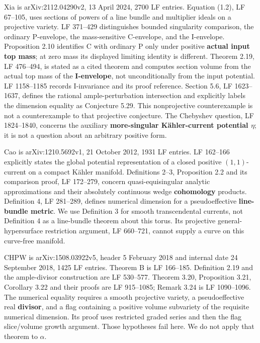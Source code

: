\documentclass[11pt]{article}
\begin{document}
Xia is arXiv:2112.04290v2, 13 April 2024, 2700 LF entries. Equation (1.2), LF 67–105, uses sections of powers of a line bundle and multiplier ideals on a projective variety. LF 371–429 distinguishes bounded singularity comparison, the ordinary P-\allowbreak{}envelope, the mass-\allowbreak{}sensitive C-\allowbreak{}envelope, and the I-\allowbreak{}envelope. Proposition 2.10 identifies C with ordinary P only under positive \textbf{actual input top mass}; at zero mass its displayed limiting identity is different. Theorem 2.19, LF 476–494, is stated as a cited theorem and computes section volume from the actual top mass of the \textbf{I-\allowbreak{}envelope}, not unconditionally from the input potential. LF 1158–1185 records I-\allowbreak{}invariance and its proof reference. Section 5.6, LF 1623–1637, defines the rational ample-\allowbreak{}perturbation intersection and explicitly labels the dimension equality as Conjecture 5.29. This nonprojective counterexample is not a counterexample to that projective conjecture. The Chebyshev question, LF 1824–1840, concerns the auxiliary \textbf{more-\allowbreak{}singular Kähler-\allowbreak{}current potential $\eta$}; it is not a question about an arbitrary positive form.

Cao is arXiv:1210.5692v1, 21 October 2012, 1931 LF entries. LF 162–166 explicitly states the global potential representation of a closed positive $(1,1)$-\allowbreak{}current on a compact Kähler manifold. Definitions 2–3, Proposition 2.2 and its comparison proof, LF 172–279, concern quasi-\allowbreak{}equisingular analytic approximations and their absolutely continuous wedge \textbf{cohomology} products. Definition 4, LF 281–289, defines numerical dimension for a pseudoeffective \textbf{line-\allowbreak{}bundle metric}. We use Definition 3 for smooth transcendental currents, not Definition 4 as a line-\allowbreak{}bundle theorem about this torus. Its projective general-\allowbreak{}hypersurface restriction argument, LF 660–721, cannot supply a curve on this curve-\allowbreak{}free manifold.

CHPW is arXiv:1508.03922v5, header 5 February 2018 and internal date 24 September 2018, 1425 LF entries. Theorem B is LF 166–185. Definition 2.19 and the ample-\allowbreak{}divisor construction are LF 530–577. Theorem 3.20, Proposition 3.21, Corollary 3.22 and their proofs are LF 915–1085; Remark 3.24 is LF 1090–1096. The numerical equality requires a smooth projective variety, a pseudoeffective real \textbf{divisor}, and a flag containing a positive volume subvariety of the requisite numerical dimension. Its proof uses restricted graded series and then the flag slice/\allowbreak{}volume growth argument. Those hypotheses fail here. We do not apply that theorem to $\alpha$.
\end{document}
